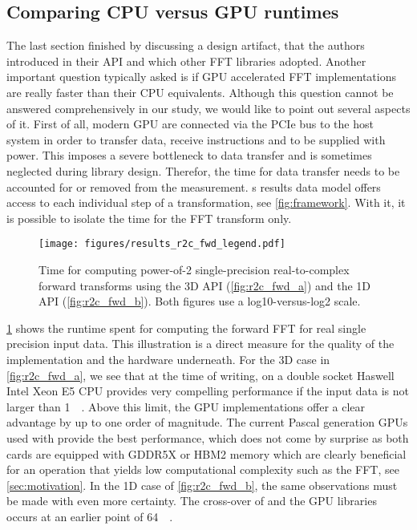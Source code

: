\subsection{Comparing CPU versus GPU runtimes}
\label{ssec:cpu_vs_gpu}

The last section finished by discussing a design artifact, that the \fftw{} authors introduced in their API and which other FFT libraries adopted. Another important question typically asked is if GPU accelerated FFT implementations are really faster than their CPU equivalents. Although this question cannot be answered comprehensively in our study, we would like to point out several aspects of it. First of all, modern GPU are connected via the PCIe bus to the host system in order to transfer data, receive instructions and to be supplied with power. This imposes a severe bottleneck to data transfer and is sometimes neglected during library design. Therefor, the time for data transfer needs to be accounted for or removed from the measurement. \gearshifft{}s results data model offers access to each individual step of a transformation, see \cref{fig:framework}. With it, it is possible to isolate the time for the FFT transform only.

\begin{figure}[!tbp]
  \centering
  \texttt{[image: figures/results\_r2c\_fwd\_legend.pdf]}\vspace{-1em}
  \hfill
  \caption{Time for computing power-of-2 single-precision real-to-complex forward transforms using the 3D API (\cref{fig:r2c_fwd_a}) and the 1D API \clfft{} (\cref{fig:r2c_fwd_b}). Both figures use a log10-versus-log2 scale.}
  \label{fig:r2c_fwd}
\end{figure}

\cref{fig:r2c_fwd} shows the runtime spent for computing the forward FFT for real single precision input data. This illustration is a direct measure for the quality of the implementation and the hardware underneath. For the 3D case in \cref{fig:r2c_fwd_a}, we see that at the time of writing, \fftw{} on a double socket Haswell Intel Xeon E5 CPU provides very compelling performance if the input data is not larger than \SI{1}{\mebi\byte}. Above this limit, the GPU implementations offer a clear advantage by up to one order of magnitude. The current Pascal generation GPUs used with \cufft{} provide the best performance, which does not come by surprise as both cards are equipped with GDDR5X or HBM2 memory which are clearly beneficial for an operation that yields low computational complexity such as the FFT, see \cref{sec:motivation}. In the 1D case of \cref{fig:r2c_fwd_b}, the same observations must be made with even more certainty. The cross-over of \fftw{} and the GPU libraries occurs at an earlier point of \SI{64}{\kibi\byte}.  

